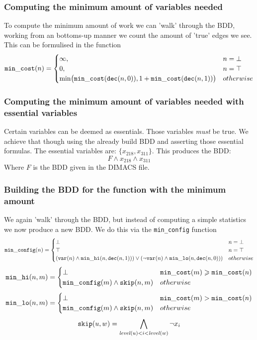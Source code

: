 \subsubsection{Computing the minimum amount of variables needed}
To compute the minimum amount of work we can 'walk' through the BDD, working from an bottoms-up manner we count the amount of 'true' edges we see.
This can be formulised in the function
\[
\mathtt{min\_cost}(n) =
\begin{cases}
\infty, & n = \bot \\
0, & n = \top \\
\min\bigl( \mathtt{min\_cost}(\mathtt{dec}(n, 0)), 1 + \mathtt{min\_cost}(\mathtt{dec}(n, 1)) \bigr) & otherwise
\end{cases}
\]


\subsubsection{Computing the minimum amount of variables needed with essential variables}
Certain variables can be deemed as essentials. Those variables \textit{must} be true.
We achieve that though using the already build BDD and asserting those essential formulas.
The essential variables are: $\{x_{218}, x_{311}\}$. This produces the BDD:
\[
F \wedge x_{218} \wedge x_{311}
\]
Where $F$ is the BDD given in the DIMACS file.

\subsubsection{Building the BDD for the function with the minimum amount}
We again 'walk' through the BDD, but instead of computing a simple statistics we now produce a new BDD.
We do this via the \verb|min_config| function
\[
\mathtt{min\_config}(n) =
\begin{cases}
\bot & n = \bot \\
\top & n = \top \\
(\mathtt{var}(n) \wedge \mathtt{min\_hi}(n,\mathtt{dec}(n, 1))) \vee (\neg \mathtt{var}(n) \wedge \mathtt{min\_lo}(n,\mathtt{dec}(n, 0))) & otherwise
\end{cases}
\]
\[
\mathtt{min\_hi}(n, m) =
\begin{cases}
\bot & \mathtt{min\_cost}(m) \geqslant \mathtt{min\_cost}(n) \\
\mathtt{min\_config}(m) \wedge \mathtt{skip}(n,m)  & otherwise
\end{cases}
\]
\[
\mathtt{min\_lo}(n, m) =
\begin{cases}
\bot & \mathtt{min\_cost}(m) > \mathtt{min\_cost}(n) \\
\mathtt{min\_config}(m) \wedge \mathtt{skip}(n,m)  & otherwise
\end{cases}
\]
\[
  \mathtt{skip}(u,w) =\bigwedge_{\mathit{level}(u) < i < \mathit{level}(w)} \neg x_i 
\]

